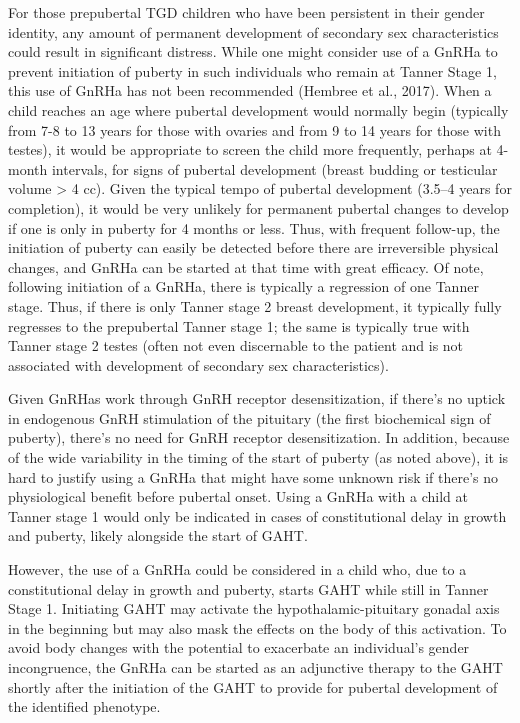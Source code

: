 \documentclass[
]{book}
\begin{document}
For those prepubertal TGD children who have
been persistent in their gender identity, any
amount of permanent development of secondary
sex characteristics could result in significant distress. While one might consider use of a GnRHa
to prevent initiation of puberty in such individuals
who remain at Tanner Stage 1, this use of GnRHa
has not been recommended (Hembree et al., 2017).
When a child reaches an age where pubertal development would normally begin (typically from 7-8
to 13 years for those with ovaries and from 9 to
14 years for those with testes), it would be appropriate to screen the child more frequently, perhaps
at 4-month intervals, for signs of pubertal development (breast budding or testicular volume \textgreater{}
4 cc). Given the typical tempo of pubertal development (3.5--4 years for completion), it would be
very unlikely for permanent pubertal changes to
develop if one is only in puberty for 4 months or
less. Thus, with frequent follow-up, the initiation
of puberty can easily be detected before there are
irreversible physical changes, and GnRHa can be
started at that time with great efficacy. Of note,
following initiation of a GnRHa, there is typically
a regression of one Tanner stage. Thus, if there is
only Tanner stage 2 breast development, it typically
fully regresses to the prepubertal Tanner stage 1;
the same is typically true with Tanner stage 2
testes (often not even discernable to the patient
and is not associated with development of secondary sex characteristics).

Given GnRHas work through GnRH receptor
desensitization, if there's no uptick in endogenous
GnRH stimulation of the pituitary (the first biochemical sign of puberty), there's no need for
GnRH receptor desensitization. In addition,
because of the wide variability in the timing of
the start of puberty (as noted above), it is hard
to justify using a GnRHa that might have some
unknown risk if there's no physiological benefit
before pubertal onset. Using a GnRHa with a
child at Tanner stage 1 would only be indicated
in cases of constitutional delay in growth and
puberty, likely alongside the start of GAHT.

However, the use of a GnRHa could be considered in a child who, due to a constitutional delay
in growth and puberty, starts GAHT while still in
Tanner Stage 1. Initiating GAHT may activate the
hypothalamic-pituitary gonadal axis in the beginning but may also mask the effects on the body
of this activation. To avoid body changes with the
potential to exacerbate an individual's gender
incongruence, the GnRHa can be started as an
adjunctive therapy to the GAHT shortly after the
initiation of the GAHT to provide for pubertal
development of the identified phenotype.
\end{document}
